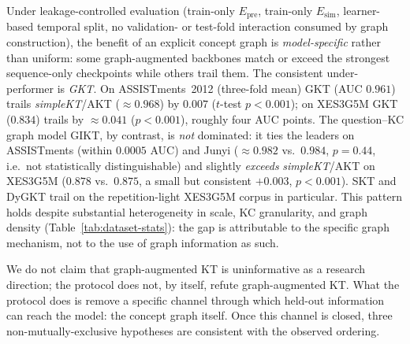 \documentclass[pdflatex,sn-basic]{sn-jnl}
\newcommand{\Epre}{\ensuremath{E_{\text{pre}}}}
\newcommand{\Esim}{\ensuremath{E_{\text{sim}}}}
\begin{document}
Under leakage-controlled evaluation (train-only $\Epre$, train-only
$\Esim$, learner-based temporal split, no validation- or test-fold
interaction consumed by graph construction), the benefit of an explicit
concept graph is \emph{model-specific} rather than uniform: some
graph-augmented backbones match or exceed the strongest sequence-only
checkpoints while others trail them. The consistent under-performer is
\emph{GKT}. On ASSISTments~2012 (three-fold mean) GKT (AUC $0.961$) trails
\textit{simpleKT}/AKT (${\approx}0.968$) by $0.007$ ($t$-test $p{<}0.001$);
on XES3G5M GKT ($0.834$) trails by ${\approx}0.041$ ($p{<}0.001$), roughly
four AUC points. The question--KC graph model GIKT, by contrast, is
\emph{not} dominated: it ties the leaders on ASSISTments (within $0.0005$
AUC) and Junyi (${\approx}0.982$ vs.\ $0.984$, $p{=}0.44$, i.e.\ not
statistically distinguishable) and slightly \emph{exceeds}
\textit{simpleKT}/AKT on XES3G5M ($0.878$ vs.\ $0.875$, a small but
consistent $+0.003$, $p{<}0.001$). SKT and DyGKT trail on the
repetition-light XES3G5M corpus in particular. This pattern holds despite
substantial heterogeneity in scale, KC granularity, and graph density
(Table~\ref{tab:dataset-stats}): the gap is attributable to the specific
graph mechanism, not to the use of graph information as such.

We do not claim that graph-augmented KT is uninformative as a research
direction; the protocol does not, by itself, refute graph-augmented KT.
What the protocol does is remove a specific channel through which
held-out information can reach the model: the concept graph itself.
Once this channel is closed, three non-mutually-exclusive hypotheses
are consistent with the observed ordering.
\end{document}
